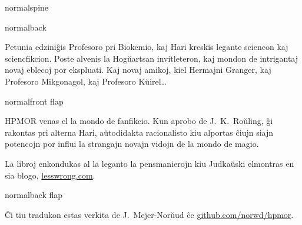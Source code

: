 \documentclass[12pt,coverwidth=\the\hpcoverwidth,coverheight=\the\hpcoverheight,spinewidth=\the\hpspinewidth,marklength=0mm,bleedwidth=5mm,flapwidth=63mm]{bookcover}
\begin{document}
\begin{bookcover}

\begin{bookcoverelement}{normal}{spine}
\centering
\color{white}\scshape
\vspace{0.5cm}\huge \volumenumber\\[2ex]\Large
\vfill
{}
\vfill
\end{bookcoverelement}

\begin{bookcoverelement}{normal}{back}
  \centering
  \vspace{20mm}
  \parbox{110mm}{\color{white}\Large\raggedright
Petunia edziniĝis Profesoro pri Biokemio, kaj Hari kreskis legante sciencon kaj sciencfikcion. Poste alvenis la Hogŭartsan invitleteron, kaj mondon de intrigantaj novaj eblecoj por ekspluati. Kaj novaj amikoj, kiel Hermajni Granger, kaj Profesoro Mikgonagol, kaj Profesoro Kŭirel…
}
\end{bookcoverelement}

\begin{bookcoverelement}{normal}{front flap}
\centering
\vspace{20mm}
\parbox{40mm}{\color{white}\raggedright\small
  HPMOR venas el la mondo de fanfikcio. Kun aprobo de J.~K.~Roŭling, ĝi rakontas pri alterna Hari, aŭtodidakta racionalisto kiu alportas ĉiujn siajn potencojn por influi la strangajn novajn vidojn de la mondo de magio.

  \bigskip La libroj enkondukas al la leganto la pensmanierojn kiu Judkaŭski elmontras en sia blogo, \url{lesswrong.com}.}
\end{bookcoverelement}

\begin{bookcoverelement}{normal}{back flap}
\centering
\vspace{20mm}
\parbox{40mm}{\color{white}\small\raggedright
  Ĉi tiu tradukon estas verkita de J.~Mejer-Norŭud ĉe \url{github.com/norwd/hpmor}.
}
\end{bookcoverelement}

\end{bookcover}
\end{document}

